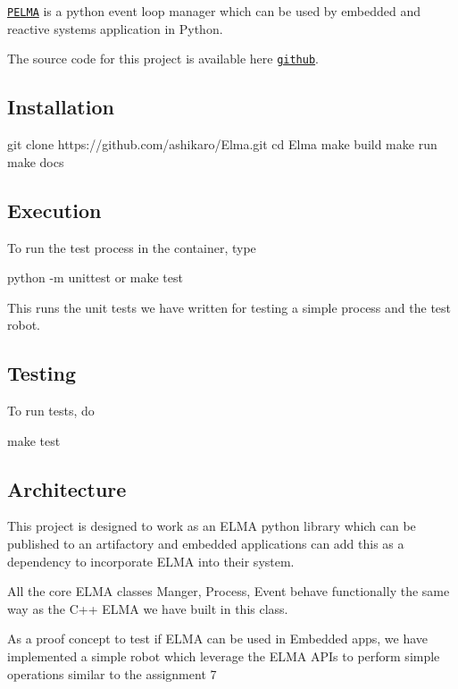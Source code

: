 \href{https://github.com/ashikaro/Elma}{\tt P\+E\+L\+MA} is a python event loop manager which can be used by embedded and reactive systems application in Python.

The source code for this project is available here \href{https://github.com/ashikaro/Elma}{\tt github}.

\subsection*{Installation }

\begin{DoxyVerb}git clone https://github.com/ashikaro/Elma.git
cd Elma
make build
make run
make docs
\end{DoxyVerb}


\subsection*{Execution }

To run the test process in the container, type \begin{DoxyVerb}python -m unittest
or 
make test
\end{DoxyVerb}


This runs the unit tests we have written for testing a simple process and the test robot.

\subsection*{Testing }

To run tests, do 
\begin{DoxyCode}
make test
\end{DoxyCode}


\subsection*{Architecture }


\begin{DoxyEnumerate}
\item This project is designed to work as an E\+L\+MA python library which can be published to an artifactory and embedded applications can add this as a dependency to incorporate E\+L\+MA into their system.
\end{DoxyEnumerate}
\begin{DoxyEnumerate}
\item All the core E\+L\+MA classes Manger, Process, Event behave functionally the same way as the C++ E\+L\+MA we have built in this class.
\end{DoxyEnumerate}
\begin{DoxyEnumerate}
\item As a proof concept to test if E\+L\+MA can be used in Embedded apps, we have implemented a simple robot which leverage the E\+L\+MA A\+P\+Is to perform simple operations similar to the assignment 7
\end{DoxyEnumerate}

